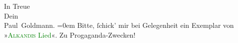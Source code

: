            \pstart
           In Treue {\\[\baselineskip]}Dein {\\[\baselineskip]}\spacefill\mbox{Paul Goldmann.}\pend
           \leftskip=0em{}\pstart
           \noindent{}Bitte, ſchick’ mir bei Gelegenheit ein Exemplar von »\textcolor{green}{\textsc{Alkandis} Lied}{}\ledrightnote{\textcolor{green}{Alkandi’s Lied}}«. Zu Progaganda-Zwecken!\pend
           \endnumbering{}  
      